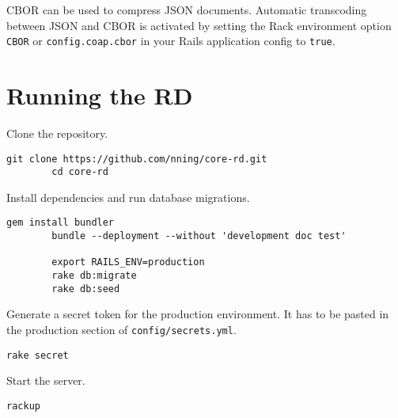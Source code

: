 	\ac{CBOR} \cite{cbor} can be used to compress \ac{JSON} documents.
	Automatic transcoding between \ac{JSON} and \ac{CBOR} is activated by
	setting the Rack environment option \texttt{CBOR} or
	\texttt{config.coap.cbor} in your Rails application config to
	\texttt{true}.

\section{Running the \acf{RD}}

	Clone the repository.

	\begin{lstlisting}[gobble=4]
		git clone https://github.com/nning/core-rd.git
		cd core-rd
	\end{lstlisting}

	Install dependencies and run database migrations.

	\begin{lstlisting}[gobble=4]
		gem install bundler
		bundle --deployment --without 'development doc test'

		export RAILS_ENV=production
		rake db:migrate
		rake db:seed
	\end{lstlisting}

	Generate a secret token for the production environment. It has to be pasted
	in the production section of \texttt{config/secrets.yml}.

	\begin{lstlisting}[gobble=4]
		rake secret
	\end{lstlisting}

	Start the server.

	\begin{lstlisting}[gobble=4]
		rackup
	\end{lstlisting}
